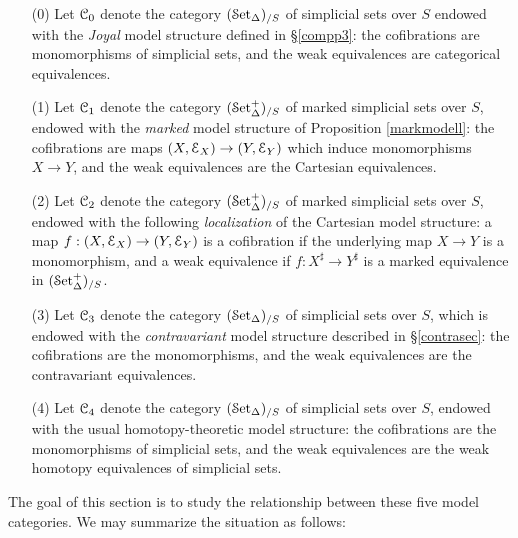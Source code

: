 \begin{itemize}
\item[(0)] Let $\operatorname{\mathcal{C}}_0$ denote the category $(\operatorname{\mathcal{S}et_{\Delta}})_{/S}$ of simplicial sets over $S$ endowed with the {\em Joyal} model structure defined in \S \ref{compp3}: the cofibrations are monomorphisms of simplicial sets, and the weak equivalences are categorical equivalences.
\item[(1)] Let $\operatorname{\mathcal{C}}_1$ denote the category $(\operatorname{\mathcal{S}et_{\Delta}^{+}})_{/S}$ of marked simplicial sets over $S$,
endowed with the {\em marked} model structure of Proposition \ref{markmodell}: the cofibrations are
maps $(X,\operatorname{\mathcal{E}}_X) \rightarrow (Y, \operatorname{\mathcal{E}}_Y)$ which induce monomorphisms $X \rightarrow Y$, and the weak equivalences are the Cartesian equivalences.
\item[(2)] Let $\operatorname{\mathcal{C}}_2$ denote the category $(\operatorname{\mathcal{S}et_{\Delta}^{+}})_{/S}$ of marked simplicial sets over $S$,
endowed with the following {\em localization} of the Cartesian model structure: a map
$f: (X, \operatorname{\mathcal{E}}_X) \rightarrow (Y, \operatorname{\mathcal{E}}_Y)$ is a cofibration if the underlying map $X \rightarrow Y$ is a monomorphism, and a weak equivalence if $f: X^{\sharp} \rightarrow Y^{\sharp}$ is a marked
equivalence in $(\operatorname{\mathcal{S}et_{\Delta}^{+}})_{/S}$.
\item[(3)] Let $\operatorname{\mathcal{C}}_3$ denote the category $(\operatorname{\mathcal{S}et_{\Delta}})_{/S}$ of simplicial sets over $S$, which
is endowed with the {\em contravariant} model structure described in \S \ref{contrasec}: the cofibrations are the monomorphisms, and the weak equivalences are the contravariant equivalences.
\item[(4)] Let $\operatorname{\mathcal{C}}_4$ denote the category $(\operatorname{\mathcal{S}et_{\Delta}})_{/S}$ of simplicial sets over $S$, endowed with the usual homotopy-theoretic model structure: the cofibrations are the monomorphisms of simplicial sets, and the weak equivalences are the weak homotopy equivalences of simplicial sets.
\end{itemize}

The goal of this section is to study the relationship between these five model categories.
We may summarize the situation as follows:

